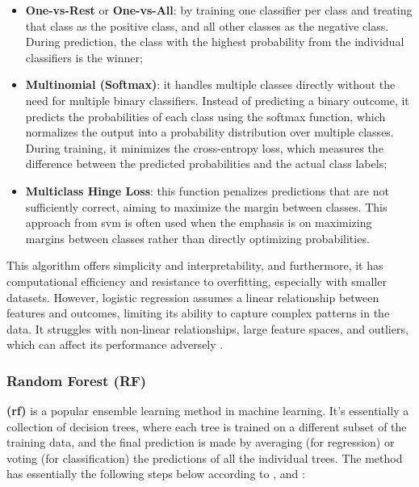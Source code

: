 \begin{itemize}
    \item \textbf{One-vs-Rest} or \textbf{One-vs-All}: by training one classifier per class and treating that class as the positive class, and all other classes as the negative class. During prediction, the class with the highest probability from the individual classifiers is the winner;
    \item \textbf{Multinomial (Softmax)}: it handles multiple classes directly without the need for multiple binary classifiers. Instead of predicting a binary outcome, it predicts the probabilities of each class using the softmax function, which normalizes the output into a probability distribution over multiple classes. During training, it minimizes the cross-entropy loss, which measures the difference between the predicted probabilities and the actual class labels;
    \item \textbf{Multiclass Hinge Loss}: this function penalizes predictions that are not sufficiently correct, aiming to maximize the margin between classes. This approach from \gls{svm} is often used when the emphasis is on maximizing margins between classes rather than directly optimizing probabilities.
\end{itemize}

This algorithm offers simplicity and interpretability, and furthermore, it has computational efficiency and resistance to overfitting, especially with smaller datasets. However, logistic regression assumes a linear relationship between features and outcomes, limiting its ability to capture complex patterns in the data. It struggles with non-linear relationships, large feature spaces, and outliers, which can affect its performance adversely \cite{Russel2010}.


\subsubsection{Random Forest (RF)}
\label{subsubsec:machine_learning_random_forest}

\textbf{ (\gls{rf})} is a popular ensemble learning method in machine learning. It's essentially a collection of decision trees, where each tree is trained on a different subset of the training data, and the final prediction is made by averaging (for regression) or voting (for classification) the predictions of all the individual trees. The method has essentially the following steps below according to \textcite{Breiman2001}, \textcite{Hartshorn2016} and \textcite{Genuer2020}:

